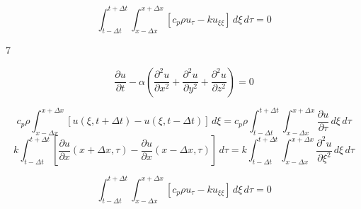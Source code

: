\documentclass{article}
\begin{document}
\begin{equation}
\int_{t-\Delta t}^{t+\Delta t}\int_{x-\Delta x}^{x+\Delta x} [c_p\rho u_\tau - k u_{\xi\xi}]\, d\xi \, d\tau = 0
\end{equation}

\newpage


\begin{center}
\Huge{7}
\end{center}

\vskip 2cm
\begin{equation}
\frac{\partial u}{\partial t} -\alpha\left(\frac{\partial^2u}{\partial x^2}+\frac{\partial^2u}{\partial y^2}+\frac{\partial^2u}{\partial z^2}\right)=0
\end{equation}

\begin{equation}
c_p\rho \int_{x-\Delta x}^{x+\Delta x} [u(\xi,t+\Delta t)-u(\xi,t-\Delta t)]\, d\xi = c_p\rho\int_{t-\Delta t}^{t+\Delta t}\int_{x-\Delta x}^{x+\Delta x} \frac{\partial u}{\partial\tau}\,d\xi \, d\tau
\end{equation}
\begin{equation}
k\int_{t-\Delta t}^{t+\Delta t}\left[\frac{\partial u}{\partial x}(x+\Delta x,\tau)-\frac{\partial u}{\partial x}(x-\Delta x,\tau)\right]\,d\tau = k\int_{t-\Delta t}^{t+\Delta t}\int_{x-\Delta x}^{x+\Delta x}\frac{\partial^2u}{\partial\xi^2}\,d\xi\, d\tau
\end{equation}

\begin{equation}
\int_{t-\Delta t}^{t+\Delta t}\int_{x-\Delta x}^{x+\Delta x} [c_p\rho u_\tau - k u_{\xi\xi}]\, d\xi \, d\tau = 0
\end{equation}
\end{document}
